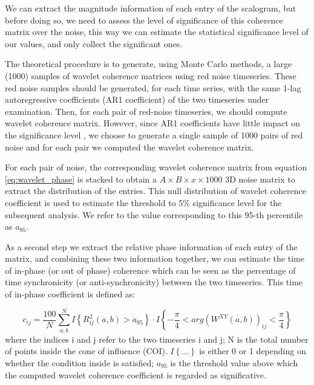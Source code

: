 \documentclass[11pt]{report}
\begin{document}
We can extract the magnitude information of each entry of the scalogram, but before doing so, we need to assess the level of significance of this coherence matrix over the noise, this way we can estimate the statistical significance level of our values, and only collect the significant ones.

The theoretical procedure \cite{grinsted-2004} \cite{bernas-2018} is to generate, using Monte Carlo methods, a large (1000) samples of wavelet coherence matrices using red noise timeseries. \cite{hartmann-2014}
These red noise samples should be generated, for each time series, with the same 1-lag autoregressive coefficients (AR1 coefficient) of the two timeseries under examination.
Then, for each pair of red-noise timeseries, we should compute wavelet coherence matrix.
However, since AR1 coefficients have little impact on the significance level \cite{grinsted-2004}, we choose to generate a single sample of 1000 pairs of red noise and for each pair we computed the wavelet coherence matrix.

For each pair of noise, the corresponding wavelet coherence matrix from equation \ref{eq:wavelet_phase} is stacked to obtain a $A\times B \times x \times 1000$ 3D noise matrix to extract the distribution of the entries.
This null distribution of wavelet coherence coefficient is used to estimate the threshold to 5\% significance level for the subsequent analysis.
We refer to the value corresponding to this 95-th percentile as $a_{95}$.


As a second step we extract the relative phase information of each entry of the matrix, and combining these two information together, we can estimate the time of in-phase (or out of phase) coherence which can be seen as the percentage of time synchronicity (or anti-synchronicity) between the two timeseries. \cite{bernas-2018}
This time of in-phase coefficient is defined as:

\begin{equation} \label{eq:wavelet_inphase}
c_{ij} = \frac{100}{N}\sum_{a, b}^N I\left\{ R_{ij}^2(a,b) > a_{95}\right\}\cdot I\left\{-\frac{\pi}{4}<arg(W^{XY}(a, b))_{ij} < \frac{\pi}{4}  \right\}
\end{equation}
where the indices i and j refer to the two timeseries i and j; N is the total number of points inside the cone of influence (COI).
$I\left\{ ...\right\}$ is either 0 or 1 depending on whether the condition inside is satisfied;
$a_{95}$ is the threshold value above which the computed wavelet coherence coefficient is regarded as significative.
\end{document}
